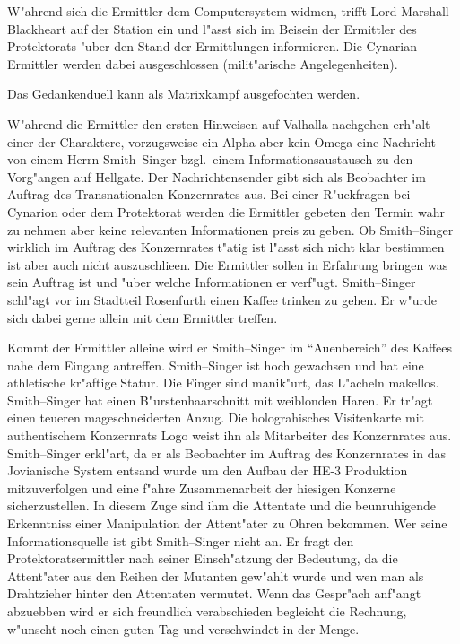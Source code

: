 W"ahrend sich die Ermittler dem Computersystem widmen, trifft Lord Marshall Blackheart auf der Station ein und l"asst sich im Beisein der Ermittler des Protektorats "uber den Stand der Ermittlungen informieren. Die Cynarian Ermittler werden dabei ausgeschlossen (milit"arische Angelegenheiten).

\begin{remarks}
	Das Gedankenduell kann als Matrixkampf ausgefochten werden.
\end{remarks}


W"ahrend die Ermittler den ersten Hinweisen auf Valhalla nachgehen erh"alt einer der Charaktere, vorzugsweise ein Alpha aber kein Omega eine Nachricht von einem Herrn Smith--Singer bzgl.~einem Informationsaustausch zu den Vorg"angen auf Hellgate. Der Nachrichtensender gibt sich als Beobachter im Auftrag des Transnationalen Konzernrates aus. Bei einer R"uckfragen bei Cynarion oder dem Protektorat werden die Ermittler gebeten den Termin wahr zu nehmen aber keine relevanten Informationen preis zu geben. Ob Smith--Singer wirklich im Auftrag des Konzernrates t"atig ist l"asst sich nicht klar bestimmen ist aber auch nicht auszuschlie\3en. Die Ermittler sollen in Erfahrung bringen was sein Auftrag ist und "uber welche Informationen er verf"ugt. Smith--Singer schl"agt vor im Stadtteil Rosenfurth einen Kaffee trinken zu gehen. Er w"urde sich dabei gerne allein mit dem Ermittler treffen.

Kommt der Ermittler alleine wird er Smith--Singer im "`Au\3enbereich"' des Kaffees nahe dem Eingang antreffen. Smith--Singer ist hoch gewachsen und hat eine athletische kr"aftige Statur. Die Finger sind manik"urt, das L"acheln makellos. Smith--Singer hat einen B"urstenhaarschnitt mit wei\3blonden Haren. Er tr"agt einen teueren ma\3geschneiderten Anzug. Die holograhisches Visitenkarte mit authentischem Konzernrats Logo weist ihn als Mitarbeiter des Konzernrates aus. Smith--Singer erkl"art, da\3 er als Beobachter im Auftrag des Konzernrates in das Jovianische System entsand wurde um den Aufbau der HE-3 Produktion mitzuverfolgen und eine f"ahre Zusammenarbeit der hiesigen Konzerne sicherzustellen. In diesem Zuge sind ihm die Attentate und die beunruhigende Erkenntniss einer Manipulation der Attent"ater zu Ohren bekommen. Wer seine Informationsquelle ist gibt Smith--Singer nicht an. Er fragt den Protektoratsermittler nach seiner Einsch"atzung der Bedeutung, da\3 die Attent"ater aus den Reihen der Mutanten gew"ahlt wurde und wen man als Drahtzieher hinter den Attentaten vermutet. Wenn das Gespr"ach anf"angt abzuebben wird er sich freundlich verabschieden begleicht die Rechnung, w"unscht noch einen guten Tag und verschwindet in der Menge.

